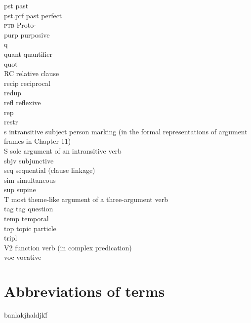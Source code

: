 \begin{refsection}
{\begin{tabbing}
{\sc pst} \> past \\
{\sc pst.prf} \> past perfect\\
\textsc{ptb} \> Proto-\\
{\sc purp}\> purposive\\
{\sc q} \> \\
{\sc quant} \> quantifier\\
{\sc quot} \> \\
{\sc RC} \> relative clause\\
{\sc recip} \> reciprocal\\
{\sc redup}\> \\
{\sc refl}\> reflexive\\
{\sc rep} \> \\
{\sc restr}\> \\
s		\> intransitive subject person marking (in the formal representations of argument frames in Chapter 11)\\
S 	\> sole argument of an intransitive verb\\
{\sc sbjv} \> subjunctive\\
{\sc seq}\> sequential (clause linkage)\\
{\sc sim} \> simultaneous\\
{\sc sup} \> supine\\
T \> most theme-like argument of a three-argument verb\\
{\sc tag} \> tag question\\
{\sc temp}\> temporal\\
{\sc top} \> topic particle\\
{\sc tripl}\> \\
{\sc V2}\> function verb (in complex predication)\\
{\sc voc}\> vocative\\
\end{tabbing}
}



\section*{Abbreviations of  terms}

 {\small
\begin{tabbing}
banlakjhaldjkf\= \kill 


\end{tabbing}}
\end{refsection}
